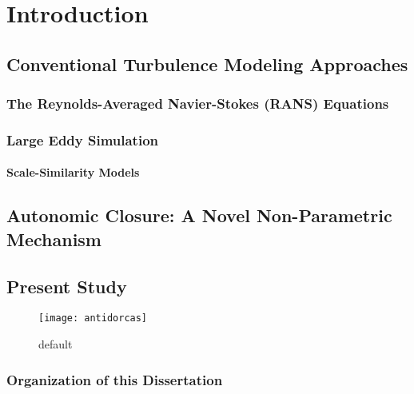 \graphicspath{ {./Ch1/}  } 

\chapter{Introduction}

\lipsum[1] 

\section{Conventional Turbulence Modeling Approaches} 

\lipsum[1] 

\subsection{The Reynolds-Averaged Navier-Stokes (RANS) Equations} 

\lipsum[1] 

\subsection{Large Eddy Simulation}

\lipsum[2]

\subsubsection{Scale-Similarity Models}

\lipsum[1]


\section{Autonomic Closure: A Novel Non-Parametric Mechanism}

\lipsum[1] \cite{krishnappa_adult_2012}

\section{Present Study}

\lipsum[1]

\begin{figure}[htbp]
	\begin{center}
	\texttt{[image: antidorcas]}
	\caption{default}
	\label{default}
	\end{center}
\end{figure}


\subsection{Organization of this Dissertation}

\lipsum[1]
